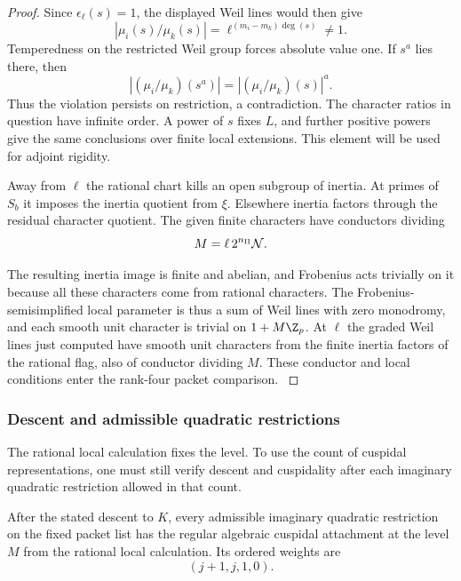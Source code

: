 \begin{proof}
Since \(\epsilon_\ell(s)=1\), the displayed
Weil lines would then give
\[
       |\mu_i(s)/\mu_k(s)|=\ell^{(m_i-m_k)\deg(s)}\ne1 .
\]
Temperedness on the restricted Weil group forces absolute value one. If \(s^a\) lies there, then
\[
 |(\mu_i/\mu_k)(s^a)|=|(\mu_i/\mu_k)(s)|^a .
\]
Thus the violation persists on restriction, a contradiction. The character ratios in question have infinite order. A power of \(s\) fixes \(L\), and
further positive powers give the same conclusions over
finite local extensions. This element will be used for
adjoint rigidity.

Away from \(\ell\) the rational chart kills an open subgroup
of inertia. At primes of \(S_b\) it imposes the inertia
quotient from \(\xi\). Elsewhere inertia factors through
the residual character quotient. The given finite characters
have conductors dividing
\[
 M=\ell\,2^{n_{\rm II}}\mathcal N.
\]

The resulting inertia image is finite and abelian, and
Frobenius acts trivially on it because all these characters
come from rational characters. The Frobenius-semisimplified
local parameter is thus a sum of Weil lines with zero
monodromy, and each smooth unit character is trivial on
\(1+M\Z_p\). At \(\ell\) the graded Weil lines just
computed have smooth unit characters from the finite
inertia factors of the rational flag, also of conductor
dividing \(M\). These conductor and local conditions enter the rank-four packet comparison. \hfill\mbox{\cite{newton-thorne-unitary}}\label{cor:ordinary-count-ii-point-output-4}

\end{proof}

\subsubsection{Descent and admissible quadratic restrictions}
\label{par:count-two-descent}

The rational local calculation fixes the level. To use the count of cuspidal representations, one must still verify descent and cuspidality after each imaginary quadratic restriction allowed in that count.

\begin{proposition}\label{prop:count-two-quadratic-packets}
After the stated descent to \(K\), every admissible imaginary
quadratic restriction on the fixed packet list has the regular
algebraic cuspidal attachment at the level \(M\) from the rational local calculation. Its ordered weights are 
\[
 (j+1,j,1,0).
\]

\end{proposition}

